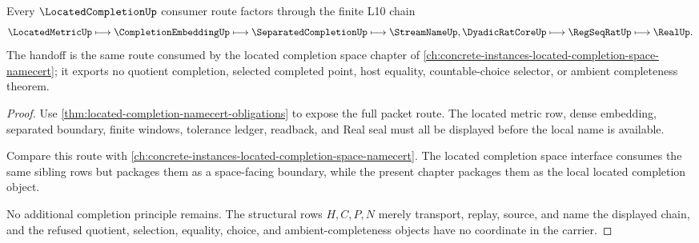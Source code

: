 \begin{theorem}
\label{thm:located-completion-l10-handoff}
Every $\LocatedCompletionUp$ consumer route factors through the finite L10 chain
$$
\LocatedMetricUp \longmapsto \CompletionEmbeddingUp \longmapsto \SeparatedCompletionUp \longmapsto \StreamNameUp,\DyadicRatCoreUp \longmapsto \RegSeqRatUp \longmapsto \RealUp .
$$
The handoff is the same route consumed by the located completion space chapter of \autoref{ch:concrete-instances-located-completion-space-namecert}; it exports no quotient completion, selected completed point, host equality, countable-choice selector, or ambient completeness theorem.
\end{theorem}
\begin{proof}
Use \autoref{thm:located-completion-namecert-obligations} to expose the full packet route. The located metric row, dense embedding, separated boundary, finite windows, tolerance ledger, readback, and Real seal must all be displayed before the local name is available.

Compare this route with \autoref{ch:concrete-instances-located-completion-space-namecert}. The located completion space interface consumes the same sibling rows but packages them as a space-facing boundary, while the present chapter packages them as the local located completion object.

No additional completion principle remains. The structural rows $H,C,P,N$ merely transport, replay, source, and name the displayed chain, and the refused quotient, selection, equality, choice, and ambient-completeness objects have no coordinate in the carrier.
\end{proof}



